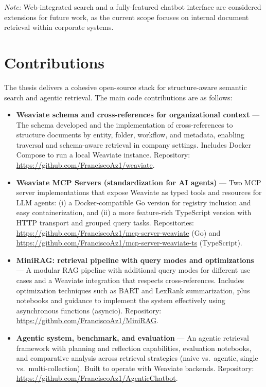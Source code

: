 \textit{Note:} Web-integrated search and a fully-featured chatbot interface are considered extensions for future work, as the current scope focuses on internal document retrieval within corporate systems.

\section{Contributions}
The thesis delivers a cohesive open-source stack for structure-aware semantic search and agentic retrieval. The main code contributions are as follows:

\begin{itemize}
	\item \textbf{Weaviate schema and cross-references for organizational context} — The schema developed and the implementation of cross-references to structure documents by entity, folder, workflow, and metadata, enabling traversal and schema-aware retrieval in company settings. Includes Docker Compose to run a local Weaviate instance. Repository: \url{https://github.com/FranciscoAz1/weaviate}.

	\item \textbf{Weaviate MCP Servers (standardization for AI agents)} — Two \gls{MCP} server implementations that expose Weaviate as typed tools and resources for LLM agents: (i) a Docker-compatible Go version for registry inclusion and easy containerization, and (ii) a more feature-rich TypeScript version with HTTP transport and grouped query tasks. Repositories: \url{https://github.com/FranciscoAz1/mcp-server-weaviate} (Go) and \url{https://github.com/FranciscoAz1/mcp-server-weaviate-ts} (TypeScript).

	\item \textbf{MiniRAG: retrieval pipeline with query modes and optimizations} — A modular RAG pipeline with additional query modes for different use cases and a Weaviate integration that respects cross-references. Includes optimization techniques such as BART and LexRank summarization, plus notebooks and guidance to implement the system effectively using asynchronous functions (asyncio). Repository: \url{https://github.com/FranciscoAz1/MiniRAG}.

	\item \textbf{Agentic system, benchmark, and evaluation} — An agentic retrieval framework with planning and reflection capabilities, evaluation notebooks, and comparative analysis across retrieval strategies (naive vs.\ agentic, single vs.\ multi-collection). Built to operate with Weaviate backends. Repository: \url{https://github.com/FranciscoAz1/AgenticChatbot}.
\end{itemize}


